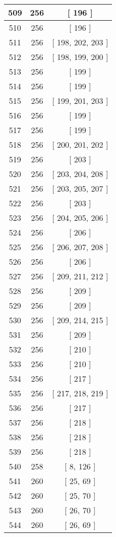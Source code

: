 \begin{center}
\begin{longtable}[H]{|| c c c ||}
509 & 256 & [ 196 ]
\\\hline
510 & 256 & [ 196 ]
\\\hline
511 & 256 & [ 198, 202, 203 ]
\\\hline
512 & 256 & [ 198, 199, 200 ]
\\\hline
513 & 256 & [ 199 ]
\\\hline
514 & 256 & [ 199 ]
\\\hline
515 & 256 & [ 199, 201, 203 ]
\\\hline
516 & 256 & [ 199 ]
\\\hline
517 & 256 & [ 199 ]
\\\hline
518 & 256 & [ 200, 201, 202 ]
\\\hline
519 & 256 & [ 203 ]
\\\hline
520 & 256 & [ 203, 204, 208 ]
\\\hline
521 & 256 & [ 203, 205, 207 ]
\\\hline
522 & 256 & [ 203 ]
\\\hline
523 & 256 & [ 204, 205, 206 ]
\\\hline
524 & 256 & [ 206 ]
\\\hline
525 & 256 & [ 206, 207, 208 ]
\\\hline
526 & 256 & [ 206 ]
\\\hline
527 & 256 & [ 209, 211, 212 ]
\\\hline
528 & 256 & [ 209 ]
\\\hline
529 & 256 & [ 209 ]
\\\hline
530 & 256 & [ 209, 214, 215 ]
\\\hline
531 & 256 & [ 209 ]
\\\hline
532 & 256 & [ 210 ]
\\\hline
533 & 256 & [ 210 ]
\\\hline
534 & 256 & [ 217 ]
\\\hline
535 & 256 & [ 217, 218, 219 ]
\\\hline
536 & 256 & [ 217 ]
\\\hline
537 & 256 & [ 218 ]
\\\hline
538 & 256 & [ 218 ]
\\\hline
539 & 256 & [ 218 ]
\\\hline
540 & 258 & [ 8, 126 ]
\\\hline
541 & 260 & [ 25, 69 ]
\\\hline
542 & 260 & [ 25, 70 ]
\\\hline
543 & 260 & [ 26, 70 ]
\\\hline
544 & 260 & [ 26, 69 ]
\\\hline

\end{longtable}
\end{center}
